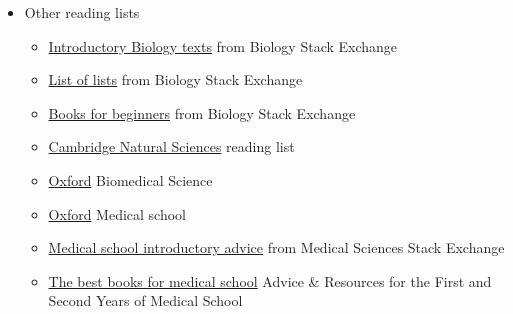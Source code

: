 \documentclass{article}
\begin{document}
\begin{itemize}
    \item Other reading lists
    \begin{itemize}
        \item \href{https://biology.stackexchange.com/questions/10376/introductory-biology-text-for-an-outsider}{Introductory Biology texts} from Biology Stack Exchange
        \item \href{https://biology.stackexchange.com/questions/35152/choosing-a-book-to-gain-general-knowledge-about-biology}{List of lists} from Biology Stack Exchange
        \item \href{https://biology.stackexchange.com/questions/21475/books-for-beginners}{Books for beginners} from Biology Stack Exchange
        \item \href{https://www.natsci.tripos.cam.ac.uk/prospective-students/reading}{Cambridge Natural Sciences} reading list
        \item \href{http://www.ox.ac.uk/sites/files/oxford/media_wysiwyg/Introductory_Reading_for_Biomedical_Sciences1.pdf}{Oxford} Biomedical Science
        \item \href{https://www.medsci.ox.ac.uk/study/medicine/pre-clinical/applying/reading}{Oxford} Medical school
        \item \href{https://medicalsciences.stackexchange.com/questions/19310/how-does-one-determine-which-textbook-to-start-with-when-wanting-to-build-knowle/19314}{Medical school introductory advice} from Medical Sciences Stack Exchange 
        \item \href{https://www.medschooladvice.com/best-advice-and-books-for-ms1-ms2-year-classes-and-shelf-exams}{The best books for medical school} Advice \& Resources for the First and Second Years of Medical School
    \end{itemize}
    

\end{itemize}
\end{document}

